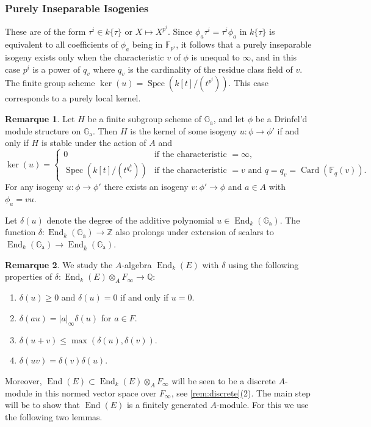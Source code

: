 \documentclass[12pt,a4paper]{article}
\theoremstyle{plain}
\theoremstyle{definition}
\newtheorem{remark}{Remarque}[section]
\theoremstyle{remark}
\DeclareMathOperator{\End}{End}
\DeclareMathOperator{\Spec}{Spec}
\DeclareMathOperator{\Card}{Card}
\newcommand{\bF}{\mathbb{F}}
\newcommand{\bQ}{\mathbb{Q}}
\newcommand{\bZ}{\mathbb{Z}}
\newcommand{\Ga}{\mathbb{G}_\mathrm{a}}
\providecommand{\Ga}{\mathbb{G}_{\mathrm a}}
\providecommand{\End}{\operatorname{End}}
\providecommand{\Spec}{\operatorname{Spec}}
\begin{document}
\subsubsection*{Purely Inseparable Isogenies}

These are of the form $\tau^i \in k\{\tau\}$ or $X \mapsto X^{p^i}$. Since $\phi_a \tau^i = \tau^i \phi_a$ in $k\{\tau\}$ is equivalent to all coefficients of $\phi_a$ being in $\bF_{p^i}$, it follows that a purely inseparable isogeny exists only when the characteristic $v$ of $\phi$ is unequal to $\infty$, and in this case $p^i$ is a power of $q_v$ where $q_v$ is the cardinality of the residue class field of $v$. The finite group scheme $\ker(u) = \Spec(k[t]/(t^{p^i}))$. This case corresponds to a purely local kernel.

\begin{remark}
\label{rem:kernel}
Let $H$ be a finite subgroup scheme of $\Ga$, and let $\phi$ be a Drinfel'd module structure on $\Ga$. Then $H$ is the kernel of some isogeny $u: \phi \to \phi'$ if and only if $H$ is stable under the action of $A$ and
\[
\ker(u) = \begin{cases} 0 & \text{if the characteristic } = \infty, \\ \Spec(k[t]/(t^{q_v^h})) & \text{if the characteristic } = v \text{ and } q = q_v = \Card(\bF_q(v)). \end{cases}
\]
For any isogeny $u: \phi \to \phi'$ there exists an isogeny $v: \phi' \to \phi$ and $a \in A$ with $\phi_a = vu$.
\end{remark}

Let $\delta(u)$ denote the degree of the additive polynomial $u \in \End_k(\Ga)$. The function $\delta: \End_k(\Ga) \to \bZ$ also prolongs under extension of scalars to $\End_k(\Ga) \to \End_{\overline{k}}(\Ga)$.

\begin{remark}
\label{rem:End}
We study the $A$-algebra $\End_k(E)$ with $\delta$ using the following properties of $\delta: \End_k(E) \otimes_A F_\infty \to \bQ$:
\begin{enumerate}[label=(\arabic*)]
\item $\delta(u) \geq 0$ and $\delta(u) = 0$ if and only if $u = 0$.
\item $\delta(au) = |a|_\infty \delta(u)$ for $a \in F$.
\item $\delta(u+v) \leq \max(\delta(u), \delta(v))$.
\item $\delta(uv) = \delta(v)\delta(u)$.
\end{enumerate}
Moreover, $\End(E) \subset \End_k(E) \otimes_A F_\infty$ will be seen to be a discrete $A$-module in this normed vector space over $F_\infty$, see \eqref{rem:discrete}(2). The main step will be to show that $\End(E)$ is a finitely generated $A$-module. For this we use the following two lemmas.
\end{remark}
\end{document}
